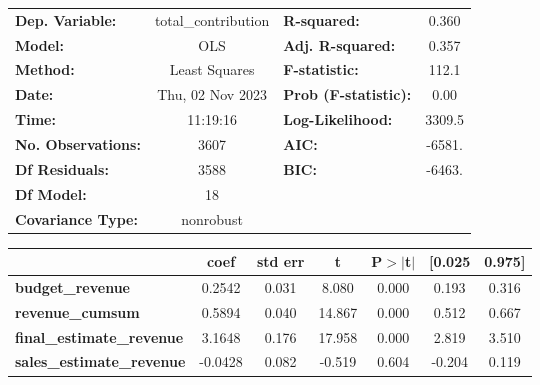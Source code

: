 \begin{center}
\begin{tabular}{lclc}
\toprule
\textbf{Dep. Variable:}                     & total\_contribution & \textbf{  R-squared:         } &     0.360   \\
\textbf{Model:}                             &         OLS         & \textbf{  Adj. R-squared:    } &     0.357   \\
\textbf{Method:}                            &    Least Squares    & \textbf{  F-statistic:       } &     112.1   \\
\textbf{Date:}                              &   Thu, 02 Nov 2023  & \textbf{  Prob (F-statistic):} &     0.00    \\
\textbf{Time:}                              &       11:19:16      & \textbf{  Log-Likelihood:    } &    3309.5   \\
\textbf{No. Observations:}                  &          3607       & \textbf{  AIC:               } &    -6581.   \\
\textbf{Df Residuals:}                      &          3588       & \textbf{  BIC:               } &    -6463.   \\
\textbf{Df Model:}                          &            18       & \textbf{                     } &             \\
\textbf{Covariance Type:}                   &      nonrobust      & \textbf{                     } &             \\
\bottomrule
\end{tabular}
\begin{tabular}{lcccccc}
                                            & \textbf{coef} & \textbf{std err} & \textbf{t} & \textbf{P$> |$t$|$} & \textbf{[0.025} & \textbf{0.975]}  \\
\midrule
\textbf{budget\_revenue}                    &       0.2542  &        0.031     &     8.080  &         0.000        &        0.193    &        0.316     \\
\textbf{revenue\_cumsum}                    &       0.5894  &        0.040     &    14.867  &         0.000        &        0.512    &        0.667     \\
\textbf{final\_estimate\_revenue}           &       3.1648  &        0.176     &    17.958  &         0.000        &        2.819    &        3.510     \\
\textbf{sales\_estimate\_revenue}           &      -0.0428  &        0.082     &    -0.519  &         0.604        &       -0.204    &        0.119     \\

\end{tabular}
\end{center}
